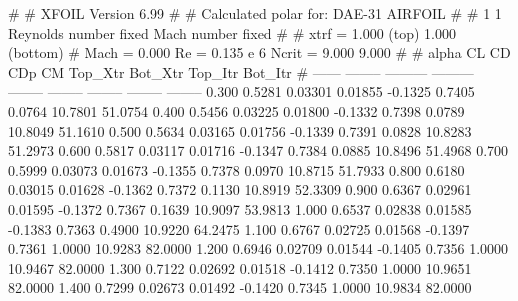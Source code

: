 #  
#       XFOIL         Version 6.99
#  
# Calculated polar for: DAE-31 AIRFOIL                                  
#  
# 1 1 Reynolds number fixed          Mach number fixed         
#  
# xtrf =   1.000 (top)        1.000 (bottom)  
# Mach =   0.000     Re =     0.135 e 6     Ncrit =   9.000  9.000
#  
#   alpha    CL        CD       CDp       CM     Top_Xtr  Bot_Xtr  Top_Itr  Bot_Itr
#  ------ -------- --------- --------- -------- -------- -------- -------- --------
   0.300   0.5281   0.03301   0.01855  -0.1325   0.7405   0.0764  10.7801  51.0754
   0.400   0.5456   0.03225   0.01800  -0.1332   0.7398   0.0789  10.8049  51.1610
   0.500   0.5634   0.03165   0.01756  -0.1339   0.7391   0.0828  10.8283  51.2973
   0.600   0.5817   0.03117   0.01716  -0.1347   0.7384   0.0885  10.8496  51.4968
   0.700   0.5999   0.03073   0.01673  -0.1355   0.7378   0.0970  10.8715  51.7933
   0.800   0.6180   0.03015   0.01628  -0.1362   0.7372   0.1130  10.8919  52.3309
   0.900   0.6367   0.02961   0.01595  -0.1372   0.7367   0.1639  10.9097  53.9813
   1.000   0.6537   0.02838   0.01585  -0.1383   0.7363   0.4900  10.9220  64.2475
   1.100   0.6767   0.02725   0.01568  -0.1397   0.7361   1.0000  10.9283  82.0000
   1.200   0.6946   0.02709   0.01544  -0.1405   0.7356   1.0000  10.9467  82.0000
   1.300   0.7122   0.02692   0.01518  -0.1412   0.7350   1.0000  10.9651  82.0000
   1.400   0.7299   0.02673   0.01492  -0.1420   0.7345   1.0000  10.9834  82.0000
